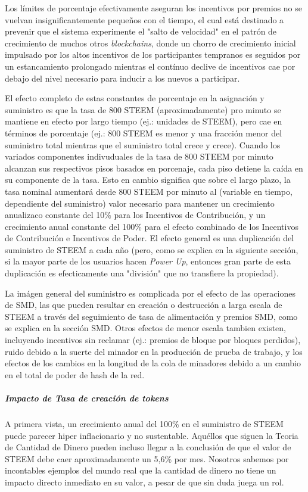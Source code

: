 \documentclass[a4paper,titlepage,final]{article}
\begin{document}
Los límites de porcentaje efectivamente aseguran los incentivos por premios no se vuelvan insignificantemente pequeños con el tiempo, el cual está destinado a prevenir que el sistema experimente el "salto de velocidad" en el patrón de crecimiento de muchos otros \textit{blockchains}, donde un chorro de crecimiento inicial impulsado por los altos incentivos de los participantes tempranos es seguidos por un estancamiento prolongado mientras el contínuo declive de incentivos cae por debajo del nivel necesario para inducir a los nuevos a participar.

El efecto completo de estas constantes de porcentaje en la asignación y suministro es que la tasa de 800 STEEM (aproximadamente) pro minuto se mantiene en efecto por largo tiempo (ej.: unidades de STEEM), pero cae en términos de porcentaje (ej.: 800 STEEM es menor y una fracción menor del suministro total mientras que el suministro total crece y crece). Cuando los variados componentes indivuduales de la tasa de 800 STEEM por minuto alcanzan sus respectivos pisos basados en porcenaje, cada piso detiene la caída en su componente de la tasa. Esto en cambio significa que sobre el largo plazo, la tasa nominal aumentará desde 800 STEEM por minuto al (variable en tiempo, dependiente del suministro) valor necesario para mantener un crecimiento anualizaco constante del 10\% para los Incentivos de Contribución, y un crecimiento anual constante del 100\% para el efecto combinado de los Incentivos de Contribución e Incentivos de Poder. El efecto general es una duplicación del suministro de STEEM a cada año (pero, como se explica en la siguiente sección, si la mayor parte de los usuarios hacen \textit{Power Up}, entonces gran parte de esta duplicación es efecticamente una "división" que no transfiere la propiedad).

La imágen general del suministro es complicada por el efecto de las operaciones de SMD, las que pueden resultar en creación o destrucción a larga escala de STEEM a través del seguimiento de tasa de alimentación y premios SMD, como se explica en la sección SMD. Otros efectos de menor escala tambien existen, incluyendo incentivos sin reclamar (ej.: premios de bloque por bloques perdidos), ruido debido a la suerte del minador en la producción de prueba de trabajo, y los efectos de los cambios en la longitud de la cola de minadores debido a un cambio en el total de poder de hash de la red.

\subparagraph{Impacto de Tasa de creación de \textit{tokens}}

A primera vista, un crecimiento anual del 100\% en el suministro de STEEM puede parecer hiper inflacionario y no sustentable. Aquéllos que siguen la Teoria de Cantidad de Dinero \cite{16} pueden incluso llegar a la conclusión de que el valor de STEEM debe caer aproximadamente un 5,6\% por mes. Nosotros sabemos por incontables ejemplos del mundo real que la cantidad de dinero no tiene un impacto directo inmediato en su valor, a pesar de que sin duda juega un rol.
\end{document}
